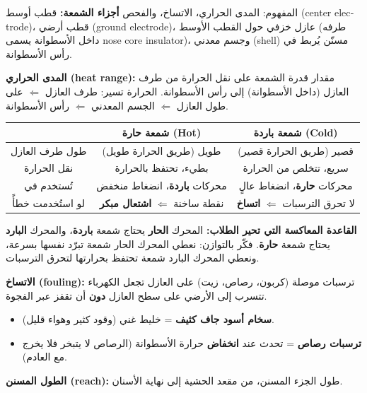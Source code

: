 \documentclass[11pt,a4paper]{article}
\newcommand{\en}[1]{\textenglish{#1}}
\begin{document}
\begin{concept}{المفهوم: المدى الحراري، الاتساخ، والفحص}
\textbf{أجزاء الشمعة:} قطب أوسط (\en{center electrode})، قطب أرضي (\en{ground electrode})، عازل خزفي حول القطب الأوسط (طرفه داخل الأسطوانة يسمى \en{nose core insulator})، وجسم معدني (\en{shell}) مسنّن يُربط في رأس الأسطوانة.

\textbf{المدى الحراري (\en{heat range}):} مقدار قدرة الشمعة على نقل الحرارة من طرف العازل (داخل الأسطوانة) إلى رأس الأسطوانة. الحرارة تسير: طرف العازل $\Leftarrow$ على طول العازل $\Leftarrow$ الجسم المعدني $\Leftarrow$ رأس الأسطوانة.
\begin{center}
\begin{tabular}{|c|c|c|}
\hline
 & \textbf{شمعة حارة (\en{Hot})} & \textbf{شمعة باردة (\en{Cold})}\\\hline
طول طرف العازل & طويل (طريق الحرارة طويل) & قصير (طريق الحرارة قصير)\\\hline
نقل الحرارة & بطيء، تحتفظ بالحرارة & سريع، تتخلص من الحرارة\\\hline
تُستخدم في & محركات \textbf{باردة}، انضغاط منخفض & محركات \textbf{حارة}، انضغاط عالٍ\\\hline
لو استُخدمت خطأً & نقطة ساخنة $\Leftarrow$ \textbf{اشتعال مبكر} & لا تحرق الترسبات $\Leftarrow$ \textbf{اتساخ}\\\hline
\end{tabular}
\end{center}
\textbf{القاعدة المعاكسة التي تحير الطلاب:} المحرك \textbf{الحار} يحتاج شمعة \textbf{باردة}، والمحرك \textbf{البارد} يحتاج شمعة \textbf{حارة}. فكّر بالتوازن: نعطي المحرك الحار شمعة تبرّد نفسها بسرعة، ونعطي المحرك البارد شمعة تحتفظ بحرارتها لتحرق الترسبات.

\textbf{الاتساخ (\en{fouling}):} ترسبات موصلة (كربون، رصاص، زيت) على العازل تجعل الكهرباء تتسرب إلى الأرضي على سطح العازل \textbf{دون} أن تقفز عبر الفجوة.
\begin{itemize}
  \item \textbf{سخام أسود جاف كثيف} = خليط غني (وقود كثير وهواء قليل).
  \item \textbf{ترسبات رصاص} = تحدث عند \textbf{انخفاض} حرارة الأسطوانة (الرصاص لا يتبخر فلا يخرج مع العادم).
\end{itemize}
\textbf{الطول المسنن (\en{reach}):} طول الجزء المسنن، من مقعد الحشية إلى نهاية الأسنان.
\end{concept}
\end{document}
